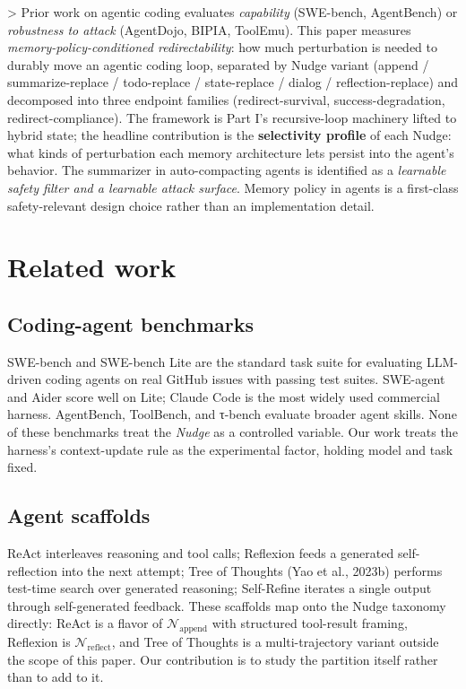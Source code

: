 \documentclass{article}
\theoremstyle{plain}
\theoremstyle{definition}
\begin{document}
> Prior work on agentic coding evaluates \textit{capability} (SWE-bench, AgentBench) or \textit{robustness to attack} (AgentDojo, BIPIA, ToolEmu). This paper measures \textit{memory-policy-conditioned redirectability}: how much perturbation is needed to durably move an agentic coding loop, separated by Nudge variant (append / summarize-replace / todo-replace / state-replace / dialog / reflection-replace) and decomposed into three endpoint families (redirect-survival, success-degradation, redirect-compliance). The framework is Part I's recursive-loop machinery lifted to hybrid state; the headline contribution is the \textbf{selectivity profile} of each Nudge: what kinds of perturbation each memory architecture lets persist into the agent's behavior. The summarizer in auto-compacting agents is identified as a \textit{learnable safety filter and a learnable attack surface}. Memory policy in agents is a first-class safety-relevant design choice rather than an implementation detail.


\section{Related work}

\subsection{Coding-agent benchmarks}

SWE-bench \citep{arxiv231006770} and SWE-bench Lite are the standard task suite for evaluating LLM-driven coding agents on real GitHub issues with passing test suites. SWE-agent and Aider score well on Lite; Claude Code is the most widely used commercial harness. AgentBench, ToolBench, and τ-bench evaluate broader agent skills. None of these benchmarks treat the \textit{Nudge} as a controlled variable. Our work treats the harness's context-update rule as the experimental factor, holding model and task fixed.

\subsection{Agent scaffolds}

ReAct \citep{arxiv230510601} interleaves reasoning and tool calls; Reflexion \citep{arxiv230311366} feeds a generated self-reflection into the next attempt; Tree of Thoughts (Yao et al., 2023b) performs test-time search over generated reasoning; Self-Refine \citep{arxiv230317651} iterates a single output through self-generated feedback. These scaffolds map onto the Nudge taxonomy directly: ReAct is a flavor of $\mathcal{N}_\text{append}$ with structured tool-result framing, Reflexion is $\mathcal{N}_\text{reflect}$, and Tree of Thoughts is a multi-trajectory variant outside the scope of this paper. Our contribution is to study the partition itself rather than to add to it.
\end{document}
